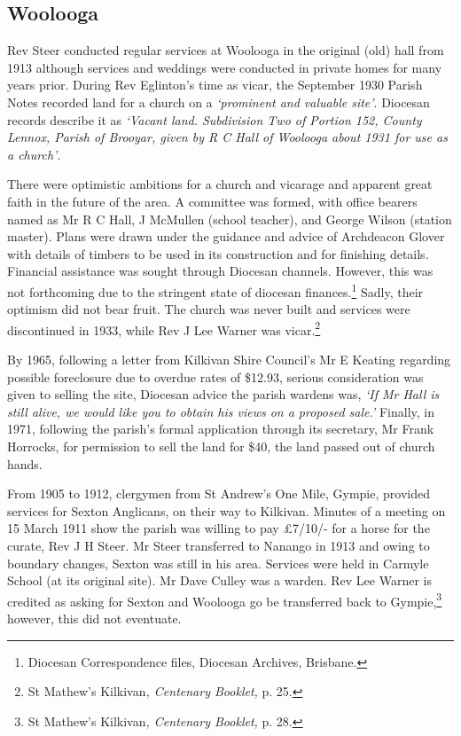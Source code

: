 \subsection{Woolooga}



Rev Steer conducted regular services at Woolooga in the original (old) hall from 1913 although services and weddings were conducted in private homes for many years prior. During Rev Eglinton's time as vicar, the September 1930 Parish Notes recorded land for a church on a \emph{`prominent and valuable site'}. Diocesan records describe it as \emph{`Vacant land. Subdivision Two of Portion 152, County Lennox, Parish of Brooyar, given by R C Hall of Woolooga about 1931 for use as a church'}.



There were optimistic ambitions for a church and vicarage and apparent great faith in the future of the area. A committee was formed, with office bearers named as Mr R C Hall, J McMullen (school teacher), and George Wilson (station master). Plans were drawn under the guidance and advice of Archdeacon Glover with details of timbers to be used in its construction and for finishing details. Financial assistance was sought through Diocesan channels. However, this was not forthcoming due to the stringent state of diocesan finances.\footnote{Diocesan Correspondence files, Diocesan Archives, Brisbane.} Sadly, their optimism did not bear fruit. The church was never built and services were discontinued in 1933, while Rev J Lee Warner was vicar.\footnote{St Mathew's Kilkivan\emph{, Centenary Booklet,} p. 25.}


By 1965, following a letter from Kilkivan Shire Council's Mr E Keating regarding possible foreclosure due to overdue rates of \$12.93, serious consideration was given to selling the site, Diocesan advice the parish wardens was, \emph{`If Mr Hall is still alive, we would like you to obtain his views on a proposed sale.'} Finally, in 1971, following the parish's formal application through its secretary, Mr Frank Horrocks, for permission to sell the land for \$40, the land passed out of church hands.



From 1905 to 1912, clergymen from St Andrew's One Mile, Gympie, provided services for Sexton Anglicans, on their way to Kilkivan. Minutes of a meeting on 15 March 1911 show the parish was willing to pay \pounds7/10/- for a horse for the curate, Rev J H Steer. Mr Steer transferred to Nanango in 1913 and owing to boundary changes, Sexton was still in his area. Services were held in Carmyle School (at its original site). Mr Dave Culley was a warden. Rev Lee Warner is credited as asking for Sexton and Woolooga go be transferred back to Gympie,\footnote{St Mathew's Kilkivan\emph{, Centenary Booklet,} p. 28.} however, this did not eventuate.



